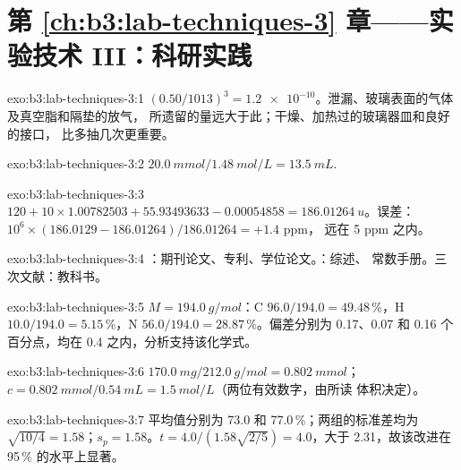\section*{第 \ref{ch:b3:lab-techniques-3} 章——实验技术 III：科研实践}

\begin{solution}{exo:b3:lab-techniques-3:1}
$(0.50/1013)^3 = \num{1.2e-10}$。泄漏、玻璃表面的气体及真空脂和隔垫的放气，
所遗留的量远大于此；干燥、加热过的玻璃器皿和良好的接口，
比多抽几次更重要。
\end{solution}

\begin{solution}{exo:b3:lab-techniques-3:2}
$\qty{20.0}{mmol}/\qty{1.48}{mol/L} = \qty{13.5}{mL}$.
\end{solution}

\begin{solution}{exo:b3:lab-techniques-3:3}
$120 + 10 \times 1.00782503 + 55.93493633 - 0.00054858 = \qty{186.01264}{u}$。误差：$10^6 \times (186.0129 - 186.01264)/186.01264 = +1.4$ ppm，
远在 5 ppm 之内。
\end{solution}

\begin{solution}{exo:b3:lab-techniques-3:4}
：期刊论文、专利、学位论文。：综述、
常数手册。三次文献：教科书。
\end{solution}

\begin{solution}{exo:b3:lab-techniques-3:5}
$M = \qty{194.0}{g/mol}$：C $96.0/194.0 = 49.48$\,\%，H $10.0/194.0 = 5.15$\,\%，N $56.0/194.0 = 28.87$\,\%。偏差分别为 0.17、0.07 和 0.16
个百分点，均在 0.4 之内，分析支持该化学式。
\end{solution}

\begin{solution}{exo:b3:lab-techniques-3:6}
$\qty{170.0}{mg}/\qty{212.0}{g/mol} = \qty{0.802}{mmol}$；$c = \qty{0.802}{mmol}/\qty{0.54}{mL} = \qty{1.5}{mol/L}$（两位有效数字，由所读
体积决定）。
\end{solution}

\begin{solution}{exo:b3:lab-techniques-3:7}
平均值分别为 73.0 和 77.0\,\%；两组的标准差均为 $\sqrt{10/4} = 1.58$；$s_p = 1.58$。$t = 4.0/(1.58\sqrt{2/5}) = 4.0$，大于
2.31，故该改进在 95\,\% 的水平上显著。
\end{solution}

